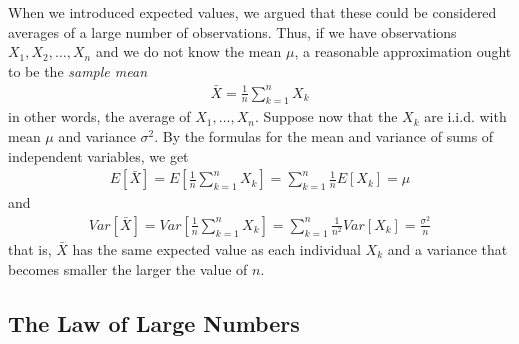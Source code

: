 When we introduced expected values, we argued that these could be considered averages of a large number of observations. Thus, if we have observations $X_1, X_2, \ldots, X_n$ and we do not know the mean $\mu$, a reasonable approximation ought to be the \textit{sample mean}
\begin{align*}
  \bar{X} = \frac{1}{n} \sum_{k = 1}^{n} X_k
\end{align*}
in other words, the average of $X_1, \ldots, X_n$. Suppose now that the $X_k$ are i.i.d. with mean $\mu$ and variance $\sigma^2$. By the formulas for the mean and variance of sums of independent variables, we get
\begin{align*}
  E[\bar{X}] = E\left[ \frac{1}{n} \sum_{k = 1}^{n} X_k \right] = \sum_{k = 1}^{n} \frac{1}{n} E[X_k] = \mu
\end{align*}
and
\begin{align*}
  Var[\bar{X}] = Var \left[\frac{1}{n} \sum_{k = 1}^{n} X_k\right] = \sum_{k = 1}^{n} \frac{1}{n^2} Var[X_k] = \frac{\sigma^2}{n}
\end{align*}
that is, $\bar{X}$ has the same expected value as each individual $X_k$ and a variance that becomes smaller the larger the value of $n$.
\vspace{-5mm}
\subsection{The Law of Large Numbers}

